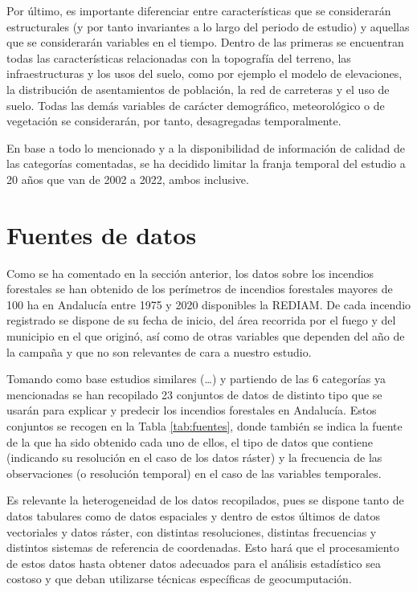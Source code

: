 \documentclass[12pt,a4paper,]{book}
\numberwithin{dummy}{section}
\theoremstyle{ocrenumbox}
\theoremstyle{blacknumex}
\theoremstyle{blacknumbox}
\theoremstyle{ocrenum}
\theoremstyle{ocrenum}
\begin{document}
Por último, es importante diferenciar entre características que se
considerarán estructurales (y por tanto invariantes a lo largo del
periodo de estudio) y aquellas que se considerarán variables en el
tiempo. Dentro de las primeras se encuentran todas las características
relacionadas con la topografía del terreno, las infraestructuras y los
usos del suelo, como por ejemplo el modelo de elevaciones, la
distribución de asentamientos de población, la red de carreteras y el
uso de suelo. Todas las demás variables de carácter demográfico,
meteorológico o de vegetación se considerarán, por tanto, desagregadas
temporalmente.

En base a todo lo mencionado y a la disponibilidad de información de
calidad de las categorías comentadas, se ha decidido limitar la franja
temporal del estudio a 20 años que van de 2002 a 2022, ambos inclusive.

\hypertarget{fuentes-de-datos}{%
\section{Fuentes de datos}\label{fuentes-de-datos}}

Como se ha comentado en la sección anterior, los datos sobre los
incendios forestales se han obtenido de los perímetros de incendios
forestales mayores de 100 ha en Andalucía entre 1975 y 2020 disponibles
la REDIAM. De cada incendio registrado se dispone de su fecha de inicio,
del área recorrida por el fuego y del municipio en el que originó, así
como de otras variables que dependen del año de la campaña y que no son
relevantes de cara a nuestro estudio.

Tomando como base estudios similares (\ldots) y partiendo de las 6
categorías ya mencionadas se han recopilado 23 conjuntos de datos de
distinto tipo que se usarán para explicar y predecir los incendios
forestales en Andalucía. Estos conjuntos se recogen en la Tabla
\ref{tab:fuentes}, donde también se indica la fuente de la que ha sido
obtenido cada uno de ellos, el tipo de datos que contiene (indicando su
resolución en el caso de los datos ráster) y la frecuencia de las
observaciones (o resolución temporal) en el caso de las variables
temporales.

Es relevante la heterogeneidad de los datos recopilados, pues se dispone
tanto de datos tabulares como de datos espaciales y dentro de estos
últimos de datos vectoriales y datos ráster, con distintas resoluciones,
distintas frecuencias y distintos sistemas de referencia de coordenadas.
Esto hará que el procesamiento de estos datos hasta obtener datos
adecuados para el análisis estadístico sea costoso y que deban
utilizarse técnicas específicas de geocumputación.
\end{document}
